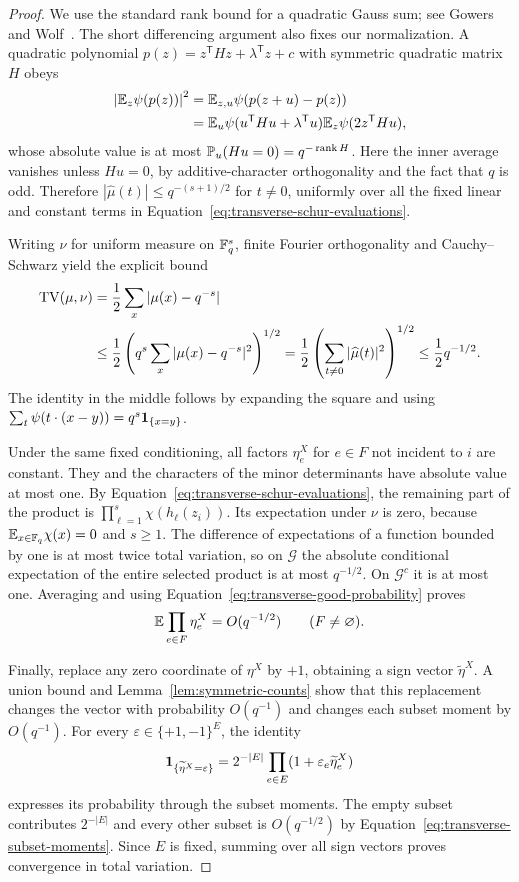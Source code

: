 \begin{proof}
We use the standard rank bound for a quadratic Gauss sum; see
Gowers and Wolf~\cite[Lemma~3.3]{gowerswolf2011}. The short differencing argument
also fixes our normalization. A quadratic polynomial
$p(z)=z^{\mathsf T}Hz+\lambda^{\mathsf T}z+c$ with symmetric quadratic
matrix $H$ obeys
\begin{align*}
 \left|\mathbb E_z\psi(p(z))\right|^2
 &=\mathbb E_{z,u}\psi(p(z+u)-p(z))\\
 &=\mathbb E_u\psi(u^{\mathsf T}Hu+\lambda^{\mathsf T}u)
               \mathbb E_z\psi(2z^{\mathsf T}Hu),
\end{align*}
whose absolute value is at most
$\mathbb P_u(Hu=0)=q^{-\operatorname{rank} H}$. Here the inner average vanishes unless
$Hu=0$, by additive-character orthogonality and the fact that $q$ is
odd. Therefore
$|\widehat\mu(t)|\leq q^{-(s+1)/2}$ for $t\ne0$, uniformly over all
the fixed linear and constant terms in
Equation~\eqref{eq:transverse-schur-evaluations}.

Writing $\nu$ for uniform measure on $\mathbb F_q^s$, finite Fourier
orthogonality and Cauchy--Schwarz yield the explicit bound
\begin{align}
\label{eq:transverse-fourier-tv}
 \operatorname{TV}(\mu,\nu)
 &=\frac12\sum_x|\mu(x)-q^{-s}|\\
 &\leq\frac12\left(q^s\sum_x|\mu(x)-q^{-s}|^2\right)^{1/2}
 =\frac12\left(\sum_{t\ne0}|\widehat\mu(t)|^2\right)^{1/2}
 \leq\frac12q^{-1/2}.\nonumber
\end{align}
The identity in the middle follows by expanding the square and using
$\sum_t\psi(t\cdot(x-y))=q^s\mathbf 1_{\{x=y\}}$.

Under the same fixed conditioning, all factors
$\eta_e^X$ for $e\in F$ not incident to $i$ are constant. They and the
characters of the minor determinants have absolute value at most one.
By Equation~\eqref{eq:transverse-schur-evaluations}, the remaining part
of the product is $\prod_{\ell=1}^s\chi(h_\ell(z_i))$. Its expectation
under $\nu$ is zero, because $\mathbb E_{x\in\mathbb F_q}\chi(x)=0$ and $s\geq1$.
The difference of expectations of a function bounded by one is at
most twice total variation, so on $\mathcal G$ the absolute conditional
expectation of the entire selected product is at most $q^{-1/2}$.
On $\mathcal G^c$ it is at most one. Averaging and using
Equation~\eqref{eq:transverse-good-probability} proves
\begin{equation}
\label{eq:transverse-subset-moments}
 \mathbb E\prod_{e\in F}\eta_e^X=O(q^{-1/2})\qquad(F\ne\varnothing).
\end{equation}

Finally, replace any zero coordinate of $\eta^X$ by $+1$, obtaining a
sign vector $\widetilde\eta^X$. A union bound and
Lemma~\ref{lem:symmetric-counts} show that this replacement changes
the vector with probability $O(q^{-1})$ and changes each subset moment
by $O(q^{-1})$. For every $\varepsilon\in\{+1,-1\}^E$, the identity
\[
 \mathbf 1_{\{\widetilde\eta^X=\varepsilon\}}
 =2^{-|E|}\prod_{e\in E}(1+\varepsilon_e\widetilde\eta_e^X)
\]
expresses its probability through the subset moments. The empty
subset contributes $2^{-|E|}$ and every other subset is $O(q^{-1/2})$
by Equation~\eqref{eq:transverse-subset-moments}. Since $E$ is fixed,
summing over all sign vectors proves convergence in total variation.
\end{proof}

